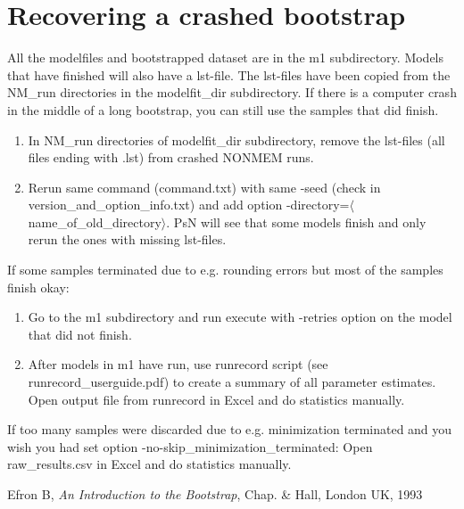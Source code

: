 \section{Recovering a crashed bootstrap}

All the modelfiles and bootstrapped dataset are in the m1 subdirectory. Models that have finished will also have a lst-file. The lst-files have been copied from the NM\_run directories in the modelfit\_dir  subdirectory.  
If there is a computer crash in the middle of a long bootstrap, you can still use the samples that did finish. 
\begin{enumerate}
	\item In NM\_run directories of modelfit\_dir subdirectory, remove the lst-files (all files ending with .lst) from crashed NONMEM runs.
	\item Rerun same command (command.txt) with same -seed (check in version\_and\_option\_info.txt) and add option -directory=$\langle$name\_of\_old\_directory$\rangle$. PsN will see that some models finish and only rerun the ones with missing lst-files. 
\end{enumerate}
If some samples terminated due to e.g. rounding errors but most of the samples finish okay: 
\begin{enumerate}
	\item Go to the m1 subdirectory and run execute with -retries option on the model that did not finish. 
	\item After models in m1 have run, use runrecord script (see runrecord\_userguide.pdf) to create a summary of all parameter estimates. Open output file from runrecord in Excel and do statistics manually. 
\end{enumerate}
If too many samples were discarded due to e.g. minimization terminated and you wish you had set  option -no-skip\_minimization\_terminated: Open raw\_results.csv in Excel and do statistics manually. 


\begin{thebibliography}{1}
 Efron B, {\em An Introduction to the Bootstrap}, Chap. \& Hall, London UK, 1993
\end{thebibliography}


